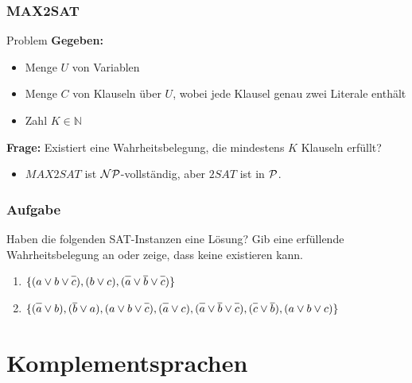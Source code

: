 \begin{frame}
\frametitle{MAX2SAT}
\begin{block}{Problem}
\textbf{Gegeben:}
\begin{itemize}
 \item Menge $U$ von Variablen
 \item Menge $C$ von Klauseln über $U$, wobei jede Klausel genau zwei Literale enthält
 \item Zahl $K \in \mathbb{N}$
\end{itemize}
\textbf{Frage:} Existiert eine Wahrheitsbelegung, die mindestens $K$ Klauseln erfüllt?
\end{block}

\begin{itemize}
	\item $MAX2SAT$ ist $\mathcal{NP}$-vollständig, aber $2SAT$ ist in $\mathcal{P}$.
\end{itemize}
\end{frame}

\begin{frame}
	\frametitle{Aufgabe}
	
	Haben die folgenden SAT-Instanzen eine Lösung? Gib eine erfüllende Wahrheitsbelegung an oder zeige, dass keine existieren kann.
\begin{enumerate}
 \item $\{(a \vee b \vee \neglit{c}), (b \vee c), (\neglit{a} \vee \neglit{b} \vee \neglit{c})\}$
 \item $\{(\neglit{a} \vee b), (\neglit{b} \vee  a), (a \vee b \vee \neglit{c}), (\neglit{a} \vee c), (\neglit{a} \vee \neglit{b} \vee \neglit{c}), (\neglit{c} \vee \neglit{b}), (a \vee b \vee c)\}$
\end{enumerate}
\end{frame}

\section{Komplementsprachen}
\subsection{}

